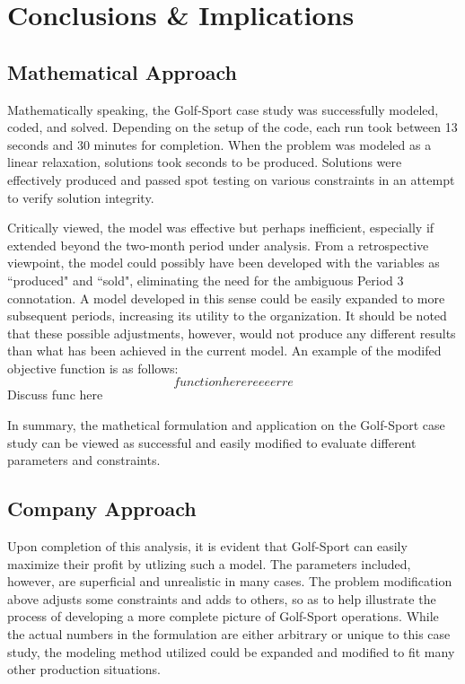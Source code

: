 \documentclass{article}
\begin{document}
\section{Conclusions \& Implications}
\subsection{Mathematical Approach}
Mathematically speaking, the Golf-Sport case study was successfully modeled, coded, and solved.  Depending on the setup of the code, each run took between 13 seconds and 30 minutes for completion.  When the problem was modeled as a linear relaxation, solutions took seconds to be produced.  Solutions were effectively produced and passed spot testing on various constraints in an attempt to verify solution integrity.
\par
Critically viewed, the model was effective but perhaps inefficient, especially if extended beyond the two-month period under analysis.  From a retrospective viewpoint, the model could possibly have been developed with the variables as ``produced" and ``sold", eliminating the need for the ambiguous Period 3 connotation.  A model developed in this sense could be easily expanded to more subsequent periods, increasing its utility to the organization.  It should be noted that these possible adjustments, however, would not produce any different results than what has been achieved in the current model.  An example of the modifed objective function is as follows:
$$ function herereeeerre $$
Discuss func here %
\par
In summary, the mathetical formulation and application on the Golf-Sport case study can be viewed as successful and easily modified to evaluate different parameters and constraints.
\subsection{Company Approach}
Upon completion of this analysis, it is evident that Golf-Sport can easily maximize their profit by utlizing such a model.  The parameters included, however, are superficial and unrealistic in many cases.  The problem modification above adjusts some constraints and adds to others, so as to help illustrate the process of developing a more complete picture of Golf-Sport operations.  While the actual numbers in the formulation are either arbitrary or unique to this case study, the modeling method utilized could be expanded and modified to fit many other production situations.
\end{document}
